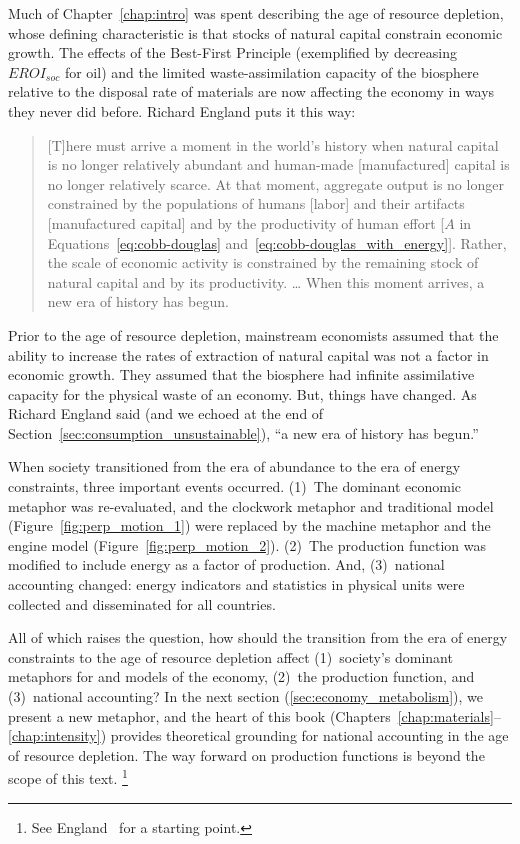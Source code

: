 Much of Chapter~\ref{chap:intro} was spent
describing the age of resource depletion,
whose defining characteristic
is that stocks of natural capital constrain economic growth.
The effects of the Best-First Principle (exemplified by decreasing $EROI_{soc}$ for oil)
and the limited waste-assimilation capacity of the biosphere
relative to the disposal rate of materials
are now affecting the economy in ways they never did before.
Richard England puts it this way:
%
\begin{quote}
	[T]here must arrive a moment in the world's history 
	when natural capital is no longer relatively abundant and 
	human-made [manufactured] capital is no longer relatively scarce. 
	At that moment, aggregate output is no longer constrained 
	by the populations of humans [labor] and their artifacts [manufactured capital]
	and by the productivity of human effort [$A$ in 
	Equations~\ref{eq:cobb-douglas} and~\ref{eq:cobb-douglas_with_energy}]. 
	Rather, the scale of economic activity is constrained 
	by the remaining stock of natural capital and by its productivity. 
	\dots
	When this moment arrives, a new era of history has begun.\cite[p.~430]{England:2000aa}
\end{quote}
%
Prior to the age of resource depletion,
mainstream economists assumed that the ability to increase 
the rates of extraction of natural capital 
was not a factor in economic growth.
They assumed that the biosphere had infinite assimilative capacity
for the physical waste of an economy.
But, things have changed. 
As Richard England said 
(and we echoed at the end of Section~\ref{sec:consumption_unsustainable}), 
``a new era of history has begun.''

When society transitioned from the era of abundance 
to the era of energy constraints,
three important events occurred.
(1)~The dominant economic metaphor was re-evaluated, and 
the clockwork metaphor and traditional model (Figure~\ref{fig:perp_motion_1})
were replaced by 
the machine metaphor and the engine model (Figure~\ref{fig:perp_motion_2}).
(2)~The production function was modified to include energy as a factor of production.
And, (3)~national accounting changed: energy indicators and statistics 
in physical units were collected and disseminated for all countries.

All of which raises the question, 
how should the transition 
from the era of energy constraints 
to the age of resource depletion affect 
(1)~society's dominant metaphors for and models of the economy,
(2)~the production function, and 
(3)~national accounting?
In the next section (\ref{sec:economy_metabolism}), we present a new metaphor, 
and the heart of this book (Chapters~\ref{chap:materials}--\ref{chap:intensity})
provides theoretical grounding for national accounting in the age of resource depletion.
The way forward on production functions
is beyond the scope of this text.%
	\footnote{
	See England~\cite{England:2000aa}
	for a starting point.
	}


